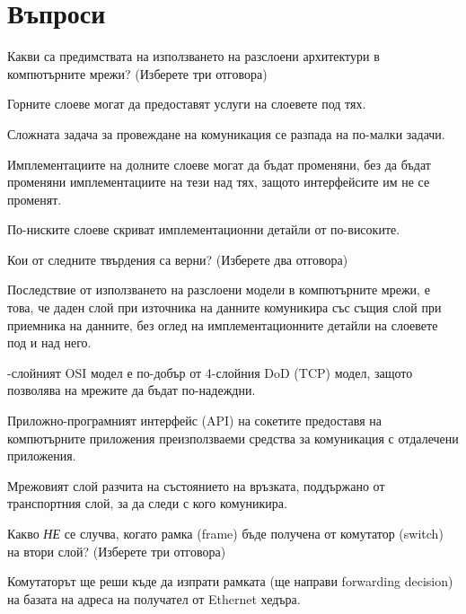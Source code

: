 \section*{Въпроси}

\begin{questions}

  \question[6] Какви са предимствата на използването на разслоени архитектури в
  компютърните мрежи? (Изберете три отговора)

  \begin{choices}
    \choice Горните слоеве могат да предоставят услуги на слоевете под тях.

    \CorrectChoice Сложната задача за провеждане на комуникация се разпада на
    по-малки задачи.

    \CorrectChoice Имплементациите на долните слоеве могат да бъдат променяни, без
    да бъдат променяни имплементациите на тези над тях, защото интерфейсите им не
    се променят.

    \CorrectChoice По-ниските слоеве скриват имплементационни детайли от
    по-високите.
  \end{choices}

  \question[6] Кои от следните твърдения са верни? (Изберете два отговора)
  \begin{choices}
    \CorrectChoice Последствие от използването на разслоени модели в компютърните
    мрежи, е това, че даден слой при източника на данните комуникира със същия
    слой при приемника на данните, без оглед на имплементационните детайли на
    слоевете под и над него.

    -слойният OSI модел е по-добър от 4-слойния
    \foreignlanguage{english}{DoD} (TCP) модел, защото позволява на мрежите да
    бъдат по-надеждни.

    \CorrectChoice Приложно-програмният интерфейс (API) на сокетите предоставя на
    компютърните приложения преизползваеми средства за комуникация с отдалечени
    приложения.

    \choice Мрежовият слой разчита на състоянието на връзката, поддържано от
    транспортния слой, за да следи с кого комуникира.
  \end{choices}

  \question[6] Какво \emph{НЕ} се случва, когато рамка
  (\foreignlanguage{english}{frame}) бъде получена от комутатор
  (\foreignlanguage{english}{switch}) на втори слой? (Изберете три отговора)

  \begin{choices}
    \choice Комутаторът ще реши къде да изпрати рамката (ще направи
    \foreignlanguage{english}{forwarding decision}) на базата на адреса на
    получател от \foreignlanguage{english}{Ethernet} хедъра.


\end{choices}
\end{questions}

